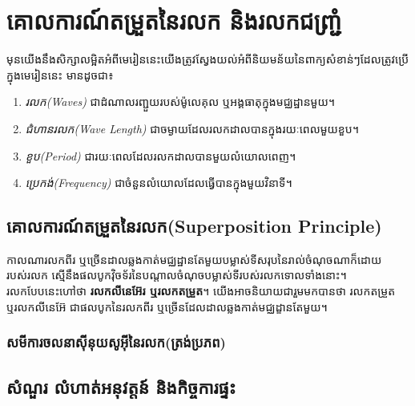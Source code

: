 \chapter{គោលការណ៍តម្រួតនៃរលក និងរលកជញ្រ្ជំ}
\quad មុនយើងនឹងសិក្សាលម្អិតអំពីមេរៀននេះយើងត្រូវស្វែងយល់អំពីនិយមន័យនៃពាក្យសំខាន់ៗដែលត្រូវប្រើក្នុងមេរៀននេះ មានដូចជា៖
\begin{definition}
	\begin{enumerate}
		\item \emph{\kml រលក{\en(Waves)}} ជាដំណាលរញ្ជួយរបស់ម៉ូលេគុល ឬអង្គធាតុក្នុងមជ្ឈដ្ឋានមួយ។
		\item \emph{\kml ជំហានរលក{\en(Wave Length)}} ជាចម្ងាយដែលរលកដាលបានក្នុងរយៈពេលមួយខួប។
		\item \emph{\kml ខួប{\en(Period)}} ជារយៈពេលដែលរលកដាលបានមួយលំយោលពេញ។
		\item \emph{\kml ប្រេកង់{\en(Frequency)}} ជាចំនួនលំយោលដែលធ្វើបានក្នុងមួយវិនាទី។
	\end{enumerate}
\end{definition}
\section{គោលការណ៍តម្រួតនៃរលក{\en(Superposition Principle)}}
\begin{definition}
	កាលណារលកពីរ ឬច្រើនដាលឆ្លងកាត់មជ្ឈដ្ឋានតែមួយបម្លាស់ទីសរុបនៃរាល់ចំណុចណាក៏ដោយរបស់រលក ស្មើនឹងផលបូកវ៉ិចទ័រនៃបណ្តាលចំណុចបម្លាស់ទីរបស់រលកទោលទាំងនោះ។\\ រលកបែបនេះហៅថា \textbf{រលកលីនេអ៊ែរ ឬរលកតម្រួត}។ យើងអាចនិយាយជារួមមកបានថា រលកតម្រួត ឬរលកលីនេអ៊ែ ជាផលបូកនៃរលកពីរ ឬច្រើនដែលដាលឆ្លងកាត់មជ្ឈដ្ខានតែមួយ។
\end{definition}
\subsection{សមីការចលនាស៊ីនុយសូអុីនៃរលក(ត្រង់ប្រភព)}
\section{សំណួរ លំហាត់អនុវត្តន៍ និងកិច្ចការផ្ទះ}